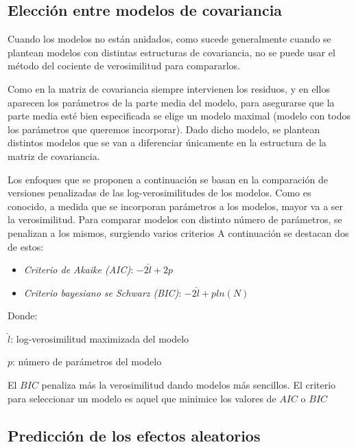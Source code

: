 \documentclass[spanish]{article}
\numberwithin{figure}{subsection}
\numberwithin{equation}{subsection}
\numberwithin{table}{subsection}
\begin{document}

\subsection{Elección entre modelos de covariancia}

Cuando los modelos no están anidados, como sucede generalmente cuando se plantean modelos con distintas estructuras
de covariancia, no se puede usar el método del cociente de verosimilitud para compararlos.

Como en la matriz de covariancia siempre intervienen los residuos, y en ellos aparecen los parámetros de la parte
media del modelo, para asegurarse que la parte media esté bien especificada se elige un modelo maximal (modelo con
todos los parámetros que queremos incorporar). Dado dicho modelo, se plantean distintos modelos que se van a diferenciar
únicamente en la estructura de la matriz de covariancia.

Los enfoques que se proponen a continuación se basan en la comparación de versiones penalizadas de las log-verosimilitudes
de los modelos. Como es conocido, a medida que se incorporan parámetros a los modelos, mayor va a ser la verosimilitud.
Para comparar modelos con distinto número de parámetros, se penalizan a los mismos, surgiendo varios criterios A
continuación se destacan dos de estos:

\begin{itemize}
	\item \textit{Criterio de Akaike (AIC)}: $-2\hat{l} + 2p$
	\item \textit{Criterio bayesiano se Schwarz (BIC)}: $-2\hat{l} + p ln(N)$
\end{itemize}

Donde:

$\hat{l}$: log-verosimilitud maximizada del modelo

$p$: número de parámetros del modelo

El $BIC$ penaliza más la verosimilitud dando modelos más sencillos. El criterio para seleccionar un modelo es aquel que
minimice los valores de $AIC$ o $BIC$


\subsection{Predicción de los efectos aleatorios}
\end{document}
